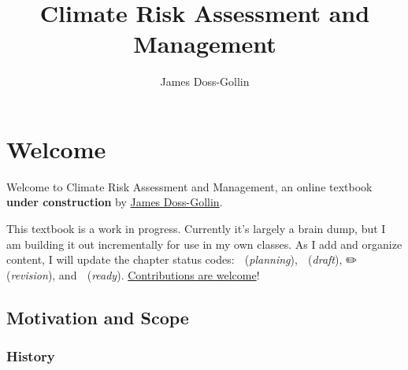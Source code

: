\documentclass[
  letterpaper,
  DIV=11,
  numbers=noendperiod]{scrreprt}
\title{Climate Risk Assessment and Management}
\author{James Doss-Gollin}
\date{}
\renewcommand*\contentsname{Table of contents}
\newcommand\contentsname{Table of contents}
\begin{document}
\maketitle

\renewcommand*\contentsname{Table of contents}
{
\hypersetup{linkcolor=}
\setcounter{tocdepth}{2}
\tableofcontents
}


\chapter*{Welcome 🎯}\label{welcome}


Welcome to Climate Risk Assessment and Management, an online textbook
\textbf{under construction} by
\href{https://jdossgollin.github.io}{James Doss-Gollin}.

\begin{tcolorbox}[enhanced jigsaw, arc=.35mm, breakable, title=\textcolor{quarto-callout-important-color}{\faExclamation}\hspace{0.5em}{Under Construction}, coltitle=black, opacityback=0, bottomtitle=1mm, colback=white, left=2mm, opacitybacktitle=0.6, toptitle=1mm, colframe=quarto-callout-important-color-frame, leftrule=.75mm, titlerule=0mm, rightrule=.15mm, bottomrule=.15mm, colbacktitle=quarto-callout-important-color!10!white, toprule=.15mm]

This textbook is a work in progress. Currently it's largely a brain
dump, but I am building it out incrementally for use in my own classes.
As I add and organize content, I will update the chapter status codes:
🚧 (\emph{planning}), 📝 (\emph{draft}), ✏️ (\emph{revision}), and 🎯
(\emph{ready}). \href{chapters/about/contributing.qmd}{Contributions are
welcome}!

\end{tcolorbox}

\section*{Motivation and Scope}\label{motivation-and-scope}


\subsection*{History}\label{history}
\end{document}
